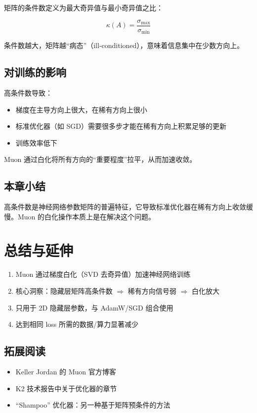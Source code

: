 \documentclass[a4paper]{article}
\begin{document}
矩阵的条件数定义为最大奇异值与最小奇异值之比：

$$
\kappa(A) = \frac{\sigma_{\max}}{\sigma_{\min}}
$$

条件数越大，矩阵越``病态''（ill-conditioned），意味着信息集中在少数方向上。

\subsection{对训练的影响}

高条件数导致：
\begin{itemize}
  \item 梯度在主导方向上很大，在稀有方向上很小
  \item 标准优化器（如 SGD）需要很多步才能在稀有方向上积累足够的更新
  \item 训练效率低下
\end{itemize}

Muon 通过白化将所有方向的``重要程度''拉平，从而加速收敛。

\subsection{本章小结}

高条件数是神经网络参数矩阵的普遍特征，它导致标准优化器在稀有方向上收敛缓慢。Muon 的白化操作本质上是在解决这个问题。

\section{总结与延伸}

\begin{enumerate}
  \item Muon 通过梯度白化（SVD 去奇异值）加速神经网络训练
  \item 核心洞察：隐藏层矩阵高条件数 $\Rightarrow$ 稀有方向信号弱 $\Rightarrow$ 白化放大
  \item 只用于 2D 隐藏层参数，与 AdamW/SGD 组合使用
  \item 达到相同 loss 所需的数据/算力显著减少
\end{enumerate}

\subsection{拓展阅读}
\begin{itemize}
  \item Keller Jordan 的 Muon 官方博客
  \item K2 技术报告中关于优化器的章节
  \item ``Shampoo'' 优化器：另一种基于矩阵预条件的方法
\end{itemize}
\end{document}
